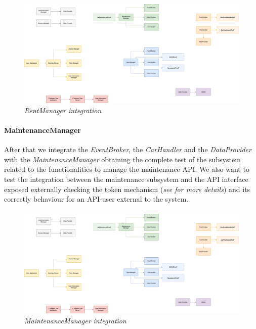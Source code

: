 \paragraph{}
		
		\begin{figure}[h]
			\centering
			\includegraphics[width=0.8\linewidth]{img/Integration3a}
			\caption{
				\label{fig:rentManager} 
				\emph{RentManager integration}
			}
		\end{figure}

\paragraph{MaintenanceManager} 
After that we integrate the \emph{EventBroker}, the \emph{CarHandler} and the \emph{DataProvider} with the \emph{MaintenanceManager} obtaining the complete test of the subsystem related to the functionalities to manage the maintenance API. We also want to test the integration between the maintenance subsystem and the API interface exposed externally checking the token mechanism (\emph{see \cite{DD} for more details}) and its correctly behaviour for an API-user external to the system.
\paragraph{}
		
		\begin{figure}[h]
			\centering
			\includegraphics[width=0.8\linewidth]{img/Integration3b}
			\caption{
				\label{fig:maintenanceManager} 
				\emph{MaintenanceManager integration}
			}
		\end{figure}
		
